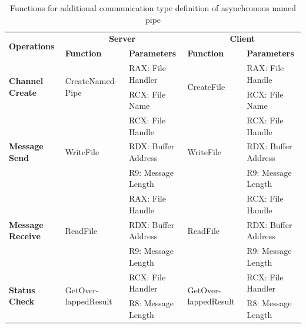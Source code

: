     \begin{table}[h]
        \centering
        \caption{Functions for additional communication type definition of asynchronous named pipe}
        \label{asynfunctions}
        \begin{tabular}{|l|l|l|l|l|}
            \hline
             \multirow{2}{*}{\textbf{Operations}} &
               \multicolumn{2}{c|}{\textbf{Server}} &
               \multicolumn{2}{c|}{\textbf{Client}} \\
             \cline{2-5}
              & \textbf{Function}& \textbf{Parameters} & \textbf{Function} & \textbf{Parameters}  \\
             \hline
             \multirow{2}{*}{\parbox{1.8cm}{\textbf{Channel Create}}}
             &\multirow{2}{*}{\parbox{2.5cm}{CreateNamed- Pipe}} &  RAX: File Handler & \multirow{2}{*}{CreateFile} &  RAX: File Handle\\
              \cline{3-3} \cline{5-5}
             &&  RCX: File Name &  &  RCX: File Name\\
            \hline
             \multirow{3}{*}{\parbox{1.8cm}{\textbf{Message Send}}}
             &\multirow{3}{*}{WriteFile} &  RCX: File Handle & \multirow{3}{*}{WriteFile} &  RCX: File Handle\\
              \cline{3-3} \cline{5-5}
             &&  RDX: Buffer Address &  &  RDX: Buffer Address\\
                           \cline{3-3} \cline{5-5}
             & &  R9: Message Length &  &  R9: Message Length\\
            \hline

            \multirow{3}{*}{\parbox{1.8cm}{\textbf{Message Receive}}}
             & \multirow{3}{*}{ReadFile}&  RAX: File Handle & \multirow{3}{*}{ReadFile} &  RCX: File Handle\\
              \cline{3-3} \cline{5-5}
              &&  RDX: Buffer Address &  &  RDX: Buffer Address\\
                           \cline{3-3} \cline{5-5}
             & &  R9: Message Length &  &  R9: Message Length\\
                          \hline
            \multirow{2}{*}{\parbox{1.8cm}{\textbf{Status Check}}}
             & \multirow{2}{*}{\parbox{2.5cm}{GetOver- lappedResult}}&  RCX: File Handler & \multirow{2}{*}{\parbox{2.5cm}{GetOver- lappedResult}} &  RCX: File Handler\\
              \cline{3-3} \cline{5-5}
             & &  R8: Message Length &  &  R8: Message Length\\
            \hline
        \end{tabular}
    \end{table}
    
